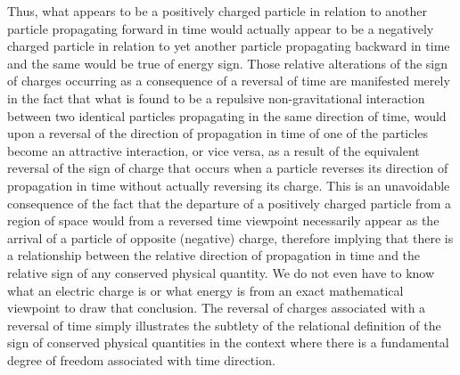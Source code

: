 \documentclass[notitlepage,12pt]{report}
\begin{document}
Thus, what appears to be a positively charged particle in relation to another particle propagating forward in time would actually appear to be a negatively charged particle in relation to yet another particle propagating backward in time and the same would be true of energy sign. Those relative alterations of the sign of charges occurring as a consequence of a reversal of time are manifested merely in the fact that what is found to be a repulsive non-gravitational interaction between two identical particles propagating in the same direction of time, would upon a reversal of the direction of propagation in time of one of the particles become an attractive interaction, or vice versa, as a result of the equivalent reversal of the sign of charge that occurs when a particle reverses its direction of propagation in time without actually reversing its charge. This is an unavoidable consequence of the fact that the departure of a positively charged particle from a region of space would from a reversed time viewpoint necessarily appear as the arrival of a particle of opposite (negative) charge, therefore implying that there is a relationship between the relative direction of propagation in time and the relative sign of any conserved physical quantity. We do not even have to know what an electric charge is or what energy is from an exact mathematical viewpoint to draw that conclusion. The reversal of charges associated with a reversal of time simply illustrates the subtlety of the relational definition of the sign of conserved physical quantities in the context where there is a fundamental degree of freedom associated with time direction.
\end{document}
